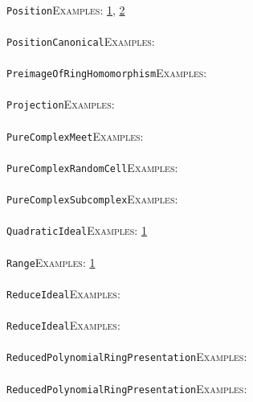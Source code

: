 \documentclass[a4paper,11pt]{report}
\begin{document}
{{ \\
 \texttt{Position}{\nobreakspace}{\nobreakspace}{\nobreakspace}{\nobreakspace}\textsc{Examples:} \href{tutorial/chap4.html} {1}{\nobreakspace}, \href{../www/SideLinks/About/aboutTensorSquare.html} {2}{\nobreakspace} \\
 \\
 \texttt{PositionCanonical}{\nobreakspace}{\nobreakspace}{\nobreakspace}{\nobreakspace}\textsc{Examples:} \\
 \\
 \texttt{PreimageOfRingHomomorphism}{\nobreakspace}{\nobreakspace}{\nobreakspace}{\nobreakspace}\textsc{Examples:} \\
 \\
 \texttt{Projection}{\nobreakspace}{\nobreakspace}{\nobreakspace}{\nobreakspace}\textsc{Examples:} \\
 \\
 \texttt{PureComplexMeet}{\nobreakspace}{\nobreakspace}{\nobreakspace}{\nobreakspace}\textsc{Examples:} \\
 \\
 \texttt{PureComplexRandomCell}{\nobreakspace}{\nobreakspace}{\nobreakspace}{\nobreakspace}\textsc{Examples:} \\
 \\
 \texttt{PureComplexSubcomplex}{\nobreakspace}{\nobreakspace}{\nobreakspace}{\nobreakspace}\textsc{Examples:} \\
 \\
 \texttt{QuadraticIdeal}{\nobreakspace}{\nobreakspace}{\nobreakspace}{\nobreakspace}\textsc{Examples:} \href{tutorial/chap10.html} {1}{\nobreakspace} \\
 \\
 \texttt{Range}{\nobreakspace}{\nobreakspace}{\nobreakspace}{\nobreakspace}\textsc{Examples:} \href{../www/SideLinks/About/aboutTensorSquare.html} {1}{\nobreakspace} \\
 \\
 \texttt{ReduceIdeal}{\nobreakspace}{\nobreakspace}{\nobreakspace}{\nobreakspace}\textsc{Examples:} \\
 \\
 \texttt{ReduceIdeal}{\nobreakspace}{\nobreakspace}{\nobreakspace}{\nobreakspace}\textsc{Examples:} \\
 \\
 \texttt{ReducedPolynomialRingPresentation}{\nobreakspace}{\nobreakspace}{\nobreakspace}{\nobreakspace}\textsc{Examples:} \\
 \\
 \texttt{ReducedPolynomialRingPresentation}{\nobreakspace}{\nobreakspace}{\nobreakspace}{\nobreakspace}\textsc{Examples:} \\
}}
\end{document}
